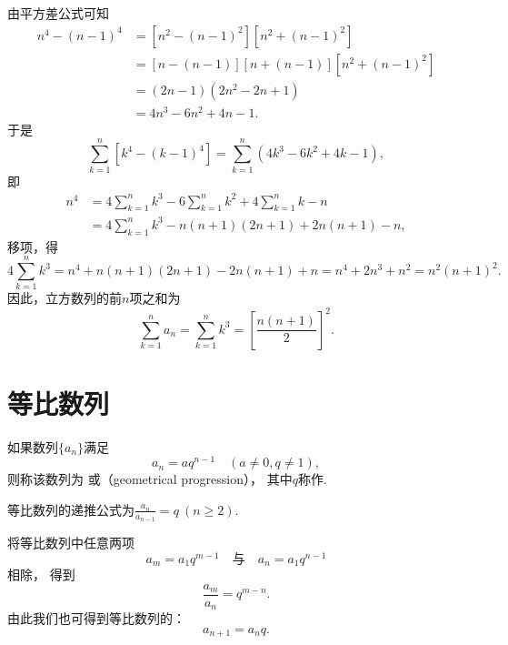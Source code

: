 由平方差公式可知
\begin{equation*}\begin{aligned}
n^4 - (n-1)^4
&= [n^2 - (n-1)^2] [n^2 + (n-1)^2] \\
&= [n - (n-1)] [n + (n-1)] [n^2 + (n-1)^2] \\
&= (2n-1) (2n^2 - 2n + 1) \\
&= 4n^3 - 6n^2 + 4n - 1.
\end{aligned}\end{equation*}
于是\begin{equation*}
\sum_{k=1}^n [k^4 - (k-1)^4]
= \sum_{k=1}^n (4k^3 - 6k^2 + 4k - 1),
\end{equation*}即\begin{equation*}\begin{aligned}
n^4
&= 4 \sum_{k=1}^n k^3 - 6 \sum_{k=1}^n k^2 + 4 \sum_{k=1}^n k - n \\
&= 4 \sum_{k=1}^n k^3 - n(n+1)(2n+1) + 2n(n+1) - n,
\end{aligned}\end{equation*}
移项，得\begin{equation*}
4 \sum_{k=1}^n k^3
= n^4 + n(n+1)(2n+1) - 2n(n+1) + n
= n^4 + 2n^3 + n^2
= n^2(n+1)^2.
\end{equation*}
因此，立方数列的前\(n\)项之和为
\begin{equation}
\sum_{k=1}^n a_n
= \sum_{k=1}^n k^3
= \left[\frac{n(n+1)}{2}\right]^2.
\end{equation}

\section{等比数列}
\begin{definition}
如果数列\(\{a_n\}\)满足\begin{equation*}
	a_n = a q^{n-1} \quad(a\neq0,q\neq1),
\end{equation*}
则称该数列为
或（geometrical progression），
其中\(q\)称作.

等比数列的递推公式为\(\frac{a_n}{a_{n-1}} = q\ (n \geq 2)\).
\end{definition}

将等比数列中任意两项\begin{equation*}
    a_m = a_1 q^{m-1}
    \quad\text{与}\quad
    a_n = a_1 q^{n-1}
\end{equation*}相除，
得到\begin{equation*}
    \frac{a_m}{a_n} = q^{m-n}.
\end{equation*}
由此我们也可得到等比数列的：
\begin{equation}
	a_{n+1} = a_n q.
\end{equation}

